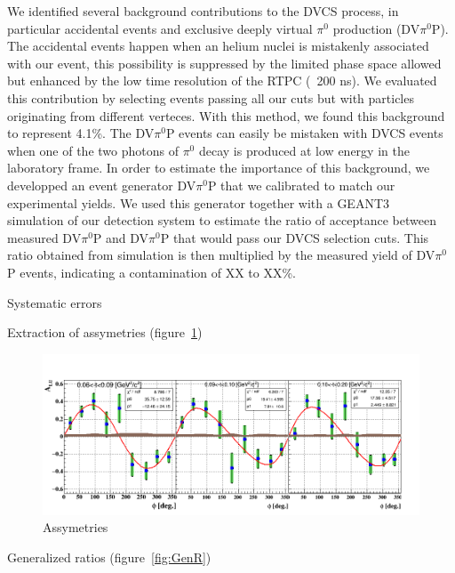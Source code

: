 \documentclass[%
 reprint,
 amsmath,amssymb,
 aps,
]{revtex4-1}
\begin{document}
We identified several background contributions to the DVCS process, in 
particular accidental events and exclusive deeply virtual $\pi^0$ production (DV$\pi^0$P). The accidental
events happen when an helium nuclei is mistakenly associated with our event, this 
possibility is suppressed by the limited phase space allowed but enhanced by the
low time resolution of the RTPC (~200 ns). We evaluated this contribution by
selecting events passing all our cuts but with particles originating from 
different verteces. With this method, we found this background to represent 
4.1\%. The DV$\pi^0$P events can easily be mistaken
with DVCS events when one of the two photons of $\pi^0$ decay is produced at
low energy in the laboratory frame. In order to estimate the importance of
this background, we developped an event generator DV$\pi^0$P 
that we calibrated to match our experimental yields. We used this generator together 
with a GEANT3~\cite{} simulation of our detection system to estimate the ratio 
of acceptance between measured DV$\pi^0$P and DV$\pi^0$P that would pass our 
DVCS selection cuts. This ratio obtained from simulation is then multiplied by 
the measured yield of DV$\pi^0$P events, indicating a contamination of XX to XX\%. 

Systematic errors


Extraction of assymetries (figure~\ref{fig:assym})

\begin{figure}[htbp]
\caption{\label{fig:assym} Assymetries}
\includegraphics[width=14cm]{coh_alu_t_phi.png}
\end{figure}


Generalized ratios (figure~\ref{fig:GenR})
\end{document}
